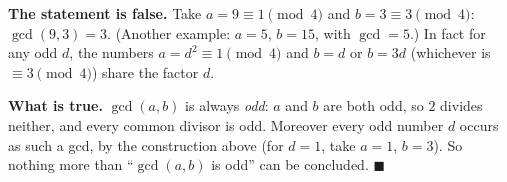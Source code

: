 \textbf{The statement is false.} Take $a=9\equiv1\pmod4$ and $b=3\equiv3\pmod4$: $\gcd(9,3)=3$. (Another example: $a=5$, $b=15$, with $\gcd=5$.) In fact for any odd $d$, the numbers $a=d^2\equiv1\pmod 4$ and $b=d$ or $b=3d$ (whichever is $\equiv3\pmod4$) share the factor $d$.

\textbf{What is true.} $\gcd(a,b)$ is always \emph{odd}: $a$ and $b$ are both odd, so $2$ divides neither, and every common divisor is odd. Moreover every odd number $d$ occurs as such a gcd, by the construction above (for $d=1$, take $a=1$, $b=3$). So nothing more than ``$\gcd(a,b)$ is odd'' can be concluded. $\blacksquare$
